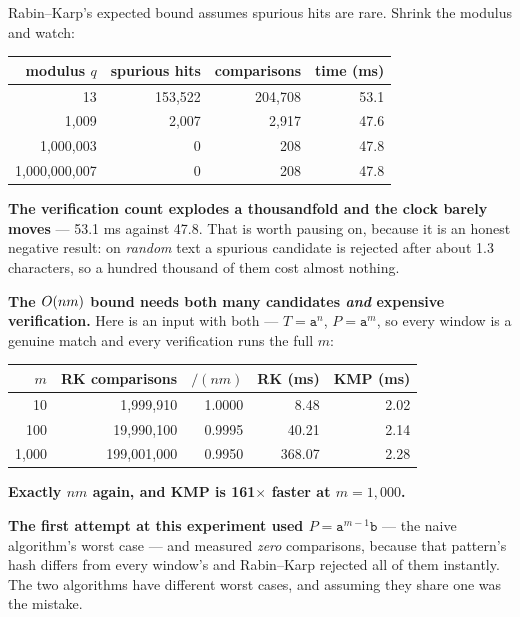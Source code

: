 \begin{worked}
Rabin--Karp's expected bound assumes spurious hits are rare. Shrink the modulus
and watch:

\begin{center}
\begin{tabular}{@{}rrrr@{}}
\toprule
\rowcolor{primary!15}
modulus $q$ & spurious hits & comparisons & time (ms) \\
\midrule
             13 & 153{,}522 & 204{,}708 & 53.1 \\
          1{,}009 &   2{,}007 &   2{,}917 & 47.6 \\
      1{,}000{,}003 &       0 &       208 & 47.8 \\
1{,}000{,}000{,}007 &       0 &       208 & 47.8 \\
\bottomrule
\end{tabular}
\end{center}

\smallskip
\textbf{The verification count explodes a thousandfold and the clock barely
moves} --- 53.1 ms against 47.8. That is worth pausing on, because it is an
honest negative result: on \emph{random} text a spurious candidate is rejected
after about 1.3 characters, so a hundred thousand of them cost almost nothing.

\smallskip
\textbf{The $O(nm)$ bound needs both many candidates \emph{and} expensive
verification.} Here is an input with both --- $T = \texttt{a}^{n}$,
$P = \texttt{a}^{m}$, so every window is a genuine match and every
verification runs the full $m$:

\begin{center}
\begin{tabular}{@{}rrrrr@{}}
\toprule
\rowcolor{primary!15}
$m$ & RK comparisons & $/(nm)$ & RK (ms) & KMP (ms) \\
\midrule
   10 &     1{,}999{,}910 & 1.0000 &   8.48 & 2.02 \\
  100 &    19{,}990{,}100 & 0.9995 &  40.21 & 2.14 \\
1{,}000 &   199{,}001{,}000 & 0.9950 & 368.07 & 2.28 \\
\bottomrule
\end{tabular}
\end{center}

\smallskip
\textbf{Exactly $nm$ again, and KMP is 161$\times$ faster at $m = 1{,}000$.}

\smallskip
\textbf{The first attempt at this experiment used $P = \texttt{a}^{m-1}
\texttt{b}$} --- the naive algorithm's worst case --- and measured
\emph{zero} comparisons, because that pattern's hash differs from every
window's and Rabin--Karp rejected all of them instantly. The two algorithms
have different worst cases, and assuming they share one was the mistake.
\end{worked}


